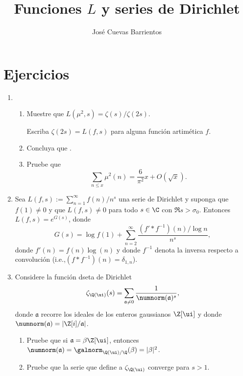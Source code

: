 \documentclass[11pt, reqno]{amsart}
\title{Funciones $L$ y series de Dirichlet}
\date{\DTMdate{2025-10-03}}
\author[José Cuevas]{José Cuevas Barrientos}
\begin{document}
\maketitle

\section{Ejercicios}
\begin{enumerate}
	\item \begin{enumerate}
			\item\lookright Muestre que $L(\mu^2, s) = \zeta(s)/\zeta(2s)$.
				\begin{hint}
					Escriba $\zeta(2s) = L(f, s)$ para alguna función artimética $f$.
				\end{hint}

			\item Concluya que .

			\item Pruebe que
				\[
					\displaystyle \sum_{n\le x} \mu^2(n) = \frac{6}{\pi^2} x + O(\sqrt{x}).
				\]
		\end{enumerate}

		\newex
	\item Sea $L(f, s) := \sum_{n=1}^{\infty} f(n)/n^s$ una serie de Dirichlet y suponga que $f(1) \ne 0$ y que $L(f, s) \ne 0$ para
		todo $s \in \C$ con $\Re s > \sigma_0$.
		Entonces $L(f, s) = e^{G(s)}$, donde
		\[
			G(s) = \log f(1) + \sum_{n=2}^{\infty} \frac{(f' * f^{-1})(n)/\log n}{n^s},
		\]
		donde $f'(n) = f(n)\log(n)$ y donde $f^{-1}$ denota la inversa respecto a convolución
		(i.e.,\break $(f * f^{-1})(n) = \delta_{1, n}$).
		\nocite{apostol:analytic}

		\newex
	\item\label{ex:dirichlet_zeta} Considere la función dseta de Dirichlet
		\[
			\zeta_{\Q(\ui)}(s) = \sum_{\mathfrak{a}\ne 0} \frac{1}{\numnorm(\mathfrak{a})^s},
		\]
		donde $\mathfrak{a}$ recorre los ideales de los enteros gaussianos $\Z[\ui]$ y donde $\numnorm(\mathfrak{a}) = |\Z[i] / \mathfrak{a}|$.
		\begin{enumerate}
			\item Pruebe que si $\mathfrak{a} = \beta \Z[\ui]$, entonces $\numnorm(\mathfrak{a}) = \galnorm_{\Q(\ui)/\Q}(\beta)
				= |\beta|^2$.

			\item Pruebe que la serie que define a $\zeta_{\Q(\ui)}$ converge para $s > 1$.


\end{enumerate}
\end{enumerate}
\end{document}

